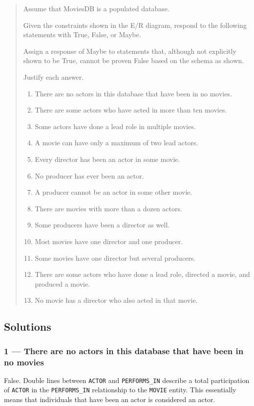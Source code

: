 \begin{quote}
  Assume that MoviesDB is a populated database.

	Given the constraints shown in the E/R diagram,
	respond to the following statements with True, False, or Maybe.

	Assign a response of Maybe to statements that, although not explicitly
  shown to be True, cannot be proven False based on the schema as shown.

  Justify each answer.

  \begin{enumerate}
    \item
      There are no actors in this database that have been in no movies.
    \item
      There are some actors who have acted in more than ten movies.
    \item
      Some actors have done a lead role in multiple movies.
    \item
      A movie can have only a maximum of two lead actors.
    \item
      Every director has been an actor in some movie.
    \item
      No producer has ever been an actor.
    \item
      A producer cannot be an actor in some other movie.
    \item
      There are movies with more than a dozen actors.
    \item
      Some producers have been a director as well.
    \item
      Most movies have one director and one producer.
    \item
      Some movies have one director but several producers.
    \item
      There are some actors who have done a lead role, directed a movie,
      and produced a movie.
    \item
      No movie has a director who also acted in that movie.
  \end{enumerate}
\end{quote}


\subsection{Solutions}

\subsubsection{1 --- There are no actors in this database that have been in no movies}
False. Double lines between \texttt{ACTOR} and \texttt{PERFORMS\_IN} describe a
total participation of \texttt{ACTOR} in the \texttt{PERFORMS\_IN} relationship
to the \texttt{MOVIE} entity.
This essentially means that individuals that have been an actor is considered an actor.


